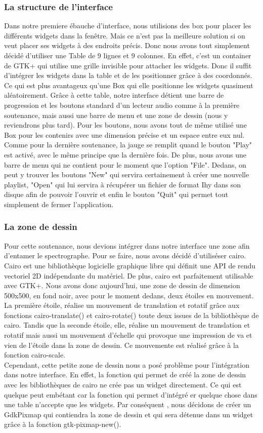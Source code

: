 \documentclass[a4paper,12pt]{article}
\begin{document}
	\subsubsection{La structure de l'interface}
Dans notre premiere ébauche d'interface, nous utilisions des box pour placer les
différents widgets dans la fenêtre. Mais ce n'est pas la meilleure solution si 
on veut placer ses widgets à des endroits précis. Donc nous avons tout simplement 
décidé d'utiliser une Table de 9 lignes et 9 colonnes. En effet, c'est un container 
de GTK+ qui utilise une grille invisible pour attacher les widgets. Donc il suffit 
d'intégrer les widgets dans la table et de les positionner grâce à des coordonnés.
Ce qui est plus avantageux qu'une Box qui elle positionne les widgets quasiment 
aléatoirement. Grâce à cette table, notre interface détient une barre de progression 
et les boutons standard d'un lecteur audio comme à la première soutenance, mais aussi 
une barre de menu et une zone de dessin (nous y reviendrons plus tard). Pour les boutons, 
nous avons tout de même utilisé une Box pour les contenirs  avec une dimension précise et un 
espace entre eux nul. Comme pour la dernière soutenance, la jauge se remplit quand
le bouton "Play" est activé, avec le même principe que la dernière fois. De plus, nous avons une 
barre de menu qui ne contient pour le moment que l'option "File". Dedans, on peut y trouver les boutons
"New" qui servira certainement à créer une nouvelle playlist, "Open" qui lui servira à 
récupérer un fichier de format Ihy dans son disque afin de pouvoir l'ouvrir et enfin 
le bouton "Quit" qui permet tout simplement de fermer l'application.
	\subsubsection{La zone de dessin}
Pour cette soutenance, nous devions intégrer dans notre interface une zone afin
d'entamer le spectrographe. Pour se faire, nous avons décidé d'utiliséser cairo.
Cairo est une bibliothèque logicielle graphique libre qui définit une API de
rendu vectoriel 2D indépendante du matériel. De plus, cairo est parfaitement
utilisable avec GTK+. Nous avons donc aujourd'hui, une zone de dessin de
dimension 500x500, en fond noir, avec pour le moment dedans, deux étoiles en
mouvement. La première étoile, réalise un mouvement de translation et rotatif 
grâce aux fonctions cairo-translate() et cairo-rotate() toute deux issues de la
bibliothèque de cairo. Tandis que la seconde étoile, elle, réalise un
mouvement de translation et rotatif mais aussi un mouvement d'échelle qui
provoque une impression de va et vien de l'étoile dans la zone de dessin. Ce
mouvemente est réalisé grâce à la fonction cairo-scale.\\
Cependant, cette petite zone de dessin nous a posé problème pour l'intégration dans
notre interface. En effet, la fonction qui permet de créé la zone de dessin avec
les bibliothèques de cairo ne crée pas un widget directement. Ce qui est quelque
peut embétant car la fonction qui permet d'intégré er quelque chose dans une table
n'accepte que les widgets. Par conséquent , nous décidons de créer un GdkPixmap
qui contiendra la zone de dessin et qui sera détenue dans un widget grâce à la
fonction gtk-pixmap-new().  
\end{document}
